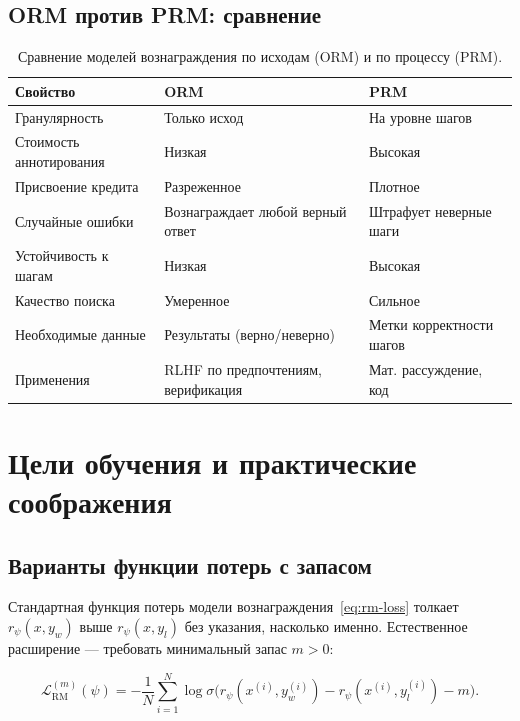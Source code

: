 \subsection{ORM против PRM: сравнение}

\begin{table}[ht]
\centering
\caption{Сравнение моделей вознаграждения по исходам (ORM) и по процессу (PRM).}
\label{tab:orm-prm}
\small
\begin{tabular}{@{}lp{4.5cm}p{4.5cm}@{}}
\toprule
\textbf{Свойство} & \textbf{ORM} & \textbf{PRM} \\
\midrule
Гранулярность & Только исход & На уровне шагов \\
Стоимость аннотирования & Низкая & Высокая \\
Присвоение кредита & Разреженное & Плотное \\
Случайные ошибки & Вознаграждает любой верный ответ & Штрафует неверные шаги \\
Устойчивость к шагам & Низкая & Высокая \\
Качество поиска & Умеренное & Сильное \\
Необходимые данные & Результаты (верно/неверно) & Метки корректности шагов \\
Применения & RLHF по предпочтениям, верификация & Мат. рассуждение, код \\
\bottomrule
\end{tabular}
\end{table}

\section{Цели обучения и практические соображения}
\label{sec:rm-objectives}

\subsection{Варианты функции потерь с запасом}

Стандартная функция потерь модели вознаграждения~\eqref{eq:rm-loss} толкает $r_\psi(x, y_w)$ выше $r_\psi(x, y_l)$ без указания, насколько именно. Естественное расширение --- требовать минимальный запас $m > 0$:

\begin{equation}
\label{eq:rm-margin-loss}
\mathcal{L}_{\mathrm{RM}}^{(m)}(\psi)
= -\frac{1}{N}\sum_{i=1}^{N}
\log \sigma\!\bigl(r_\psi(x^{(i)}, y_w^{(i)}) - r_\psi(x^{(i)}, y_l^{(i)}) - m\bigr).
\end{equation}

